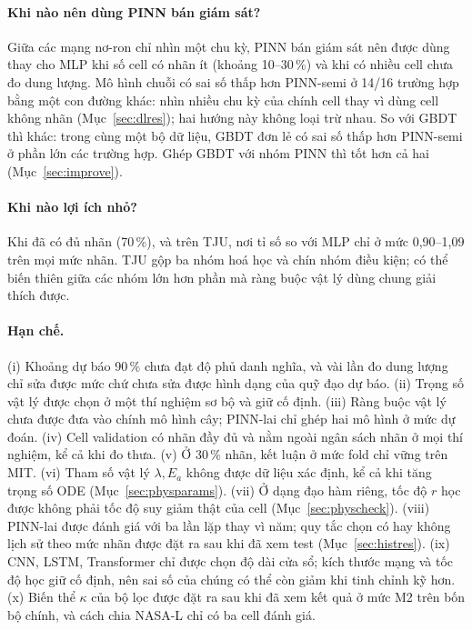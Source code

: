 \documentclass[12pt,a4paper,oneside]{report}
\theoremstyle{plain}
\theoremstyle{definition}
\begin{document}
\paragraph{Khi nào nên dùng PINN bán giám sát?} Giữa các mạng nơ-ron chỉ nhìn một chu kỳ, PINN bán giám sát nên được
dùng thay cho MLP khi số cell có nhãn ít (khoảng 10--30\,\%) và khi có nhiều cell chưa đo dung lượng. Mô hình chuỗi có sai số thấp hơn PINN-semi ở 14/16 trường hợp bằng một con đường khác: nhìn nhiều chu kỳ của chính cell thay vì dùng cell không nhãn (Mục~\ref{sec:dlres}); hai hướng này không loại trừ nhau. So với GBDT
thì khác: trong cùng một bộ dữ liệu, GBDT đơn lẻ có sai số thấp hơn PINN-semi ở phần lớn các trường hợp. Ghép
GBDT với nhóm PINN thì tốt hơn cả hai (Mục~\ref{sec:improve}).

\paragraph{Khi nào lợi ích nhỏ?} Khi đã có đủ nhãn (70\,\%), và trên TJU, nơi tỉ số so với MLP chỉ ở mức 0{,}90--1{,}09 trên mọi mức nhãn. TJU gộp ba nhóm hoá học và chín nhóm điều kiện; có thể biến thiên giữa các nhóm lớn hơn phần mà ràng buộc vật lý dùng chung giải thích được.

\paragraph{Hạn chế.} (i) Khoảng dự báo 90\,\% chưa đạt độ phủ danh nghĩa, và vài lần đo dung lượng chỉ sửa được
mức chứ chưa sửa được hình dạng của quỹ đạo dự báo. (ii) Trọng số vật lý được chọn ở một thí nghiệm sơ bộ và giữ cố định.
(iii) Ràng buộc vật lý chưa được đưa vào chính mô hình cây; PINN-lai chỉ ghép hai mô hình ở mức dự đoán. (iv) Cell validation có nhãn đầy đủ và nằm ngoài ngân sách nhãn ở mọi thí
nghiệm, kể cả khi đo thưa. (v) Ở 30\,\% nhãn, kết luận ở mức fold chỉ vững trên MIT. (vi) Tham số vật lý $\lambda, E_a$ không
được dữ liệu xác định, kể cả khi tăng trọng số ODE (Mục~\ref{sec:physparams}). (vii) Ở dạng đạo hàm riêng, tốc độ $r$ học được không phải tốc độ suy giảm thật của
cell (Mục~\ref{sec:physcheck}). (viii) PINN-lai được
đánh giá với ba lần lặp thay vì năm; quy tắc chọn có hay không lịch sử theo mức nhãn được đặt ra sau khi đã xem test
(Mục~\ref{sec:histres}). (ix) CNN, LSTM, Transformer chỉ được chọn độ dài cửa sổ; kích thước mạng và tốc độ học giữ cố
định, nên sai số của chúng có thể còn giảm khi tinh chỉnh kỹ hơn. (x) Biến thể $\kappa$ của bộ lọc được đặt ra sau khi đã xem kết quả ở mức M2 trên bốn bộ chính, và cách chia NASA-L chỉ có ba cell đánh giá.
\end{document}
